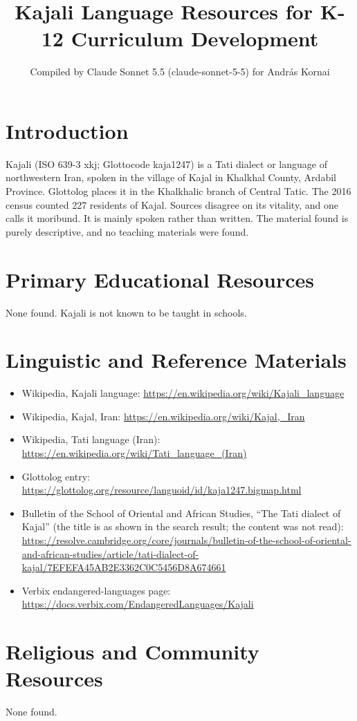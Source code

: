 \documentclass[12pt]{article}
\title{Kajali Language Resources for K-12 Curriculum Development}
\author{Compiled by Claude Sonnet 5.5 (claude-sonnet-5-5) for Andr\'as Kornai}
\date{}
\begin{document}
\maketitle

\section{Introduction}
Kajali (ISO 639-3 xkj; Glottocode kaja1247) is a Tati dialect or language of northwestern Iran, spoken in the village of Kajal in Khalkhal County, Ardabil Province. Glottolog places it in the Khalkhalic branch of Central Tatic. The 2016 census counted 227 residents of Kajal. Sources disagree on its vitality, and one calls it moribund. It is mainly spoken rather than written. The material found is purely descriptive, and no teaching materials were found.

\section{Primary Educational Resources}
None found. Kajali is not known to be taught in schools.

\section{Linguistic and Reference Materials}
\begin{itemize}
\item Wikipedia, Kajali language: \url{https://en.wikipedia.org/wiki/Kajali_language}
\item Wikipedia, Kajal, Iran: \url{https://en.wikipedia.org/wiki/Kajal,_Iran}
\item Wikipedia, Tati language (Iran): \url{https://en.wikipedia.org/wiki/Tati_language_(Iran)}
\item Glottolog entry: \url{https://glottolog.org/resource/languoid/id/kaja1247.bigmap.html}
\item Bulletin of the School of Oriental and African Studies, ``The Tati dialect of Kajal'' (the title is as shown in the search result; the content was not read): \url{https://resolve.cambridge.org/core/journals/bulletin-of-the-school-of-oriental-and-african-studies/article/tati-dialect-of-kajal/7EFEFA45AB2E3362C0C5456D8A674661}
\item Verbix endangered-languages page: \url{https://docs.verbix.com/EndangeredLanguages/Kajali}
\end{itemize}

\section{Religious and Community Resources}
None found.
\end{document}
